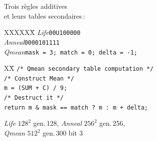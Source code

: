 \documentclass[a4paper,dvips]{slides}
\renewcommand{\arule}[1]{\emph{\mbox{#1}}} %
\renewcommand{\asquare}[1]{\ensuremath{#1^{2}}}
\newcommand{\agen}[1]{gen.\,#1}
\newcommand{\aplane}[1]{bit #1}
\newcommand{\mytitle}[1]{\begin{center}\begin{large}#1\end{large}\end{center}}
\begin{document}
\begin{slide}
  \mytitle{Trois r\`egles additives\\
    et leurs tables secondaires\,:}
  \begin{tabbing}
    XXXXXX\=\kill
    \arule{Life}\>\texttt{00U100000}\\
    \arule{Anneal}\>\texttt{0000101111}\\
    \arule{Qmean}\>\texttt{mask = 3; match = 0; delta = -1;}\\
  \end{tabbing}
  \begin{scriptsize}
    \vspace{-\bigskipamount}
    \begin{tabbing}
      XX\=\kill
      \>\texttt{/* Qmean secondary table computation */}\\
      \>\texttt{/* Construct Mean */}\\
      \>\texttt{m = (SUM + C) / 9;}\\
      \>\texttt{/* Destruct it */}\\
      \>\texttt{return~m~\&~mask~==~match~?~m~:~m~+~delta;}
    \end{tabbing}
  \end{scriptsize}
  \bigskip
  {\begin{scriptsize}
    \arule{Life} \asquare{128} \agen{128},
    \arule{Anneal} \asquare{256} \agen{256},\\
    \arule{Qmean} \asquare{512} \agen{300} \aplane{3}
    \end{scriptsize}}
\end{slide}
\end{document}
